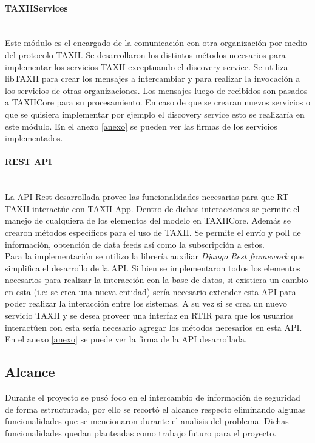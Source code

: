 \paragraph{TAXIIServices}\ \\
Este módulo es el encargado de la comunicación con otra organización por medio del protocolo TAXII. Se desarrollaron  los distintos métodos necesarios para implementar los servicios TAXII exceptuando el discovery service.
Se utiliza libTAXII para crear los mensajes a intercambiar y para realizar la invocación a los servicios de otras organizaciones.
Los mensajes luego de recibidos son pasados a TAXIICore para su procesamiento.
En caso de que se crearan nuevos servicios o que se quisiera implementar por ejemplo el discovery service esto se realizaría en este módulo.
En el anexo \ref{anexo} se pueden ver las firmas de los servicios implementados.

\paragraph{REST API}\ \\
La API Rest desarrollada provee las funcionalidades necesarias para que RT-TAXII interactúe con TAXII App. Dentro de dichas interacciones se permite el manejo de cualquiera de los elementos del modelo en TAXIICore. Además se crearon métodos específicos para el uso de TAXII. Se permite el envío y poll de información, obtención de data feeds así como la subscripción a estos.\\

Para la implementación se utilizo la librería auxiliar \textit{Django Rest framework} que simplifica el desarrollo de la API.
Si bien se implementaron todos los elementos necesarios para realizar la interacción con la base de datos, si existiera un cambio en esta (i.e: se crea una nueva entidad) sería necesario extender esta API para poder realizar la interacción entre los sistemas. A su vez si se crea un nuevo servicio TAXII y se desea proveer una interfaz en RTIR para que los usuarios interactúen con esta sería necesario agregar los métodos necesarios en esta API.
En el anexo \ref{anexo} se puede ver la firma de la API desarrollada.


\subsection{Alcance}

Durante el proyecto se pusó foco en el intercambio de información de seguridad de forma estructurada, por ello se recortó el alcance respecto eliminando algunas funcionalidades que se mencionaron durante el analisis del problema. Dichas funcionalidades quedan planteadas como trabajo futuro para el proyecto.

